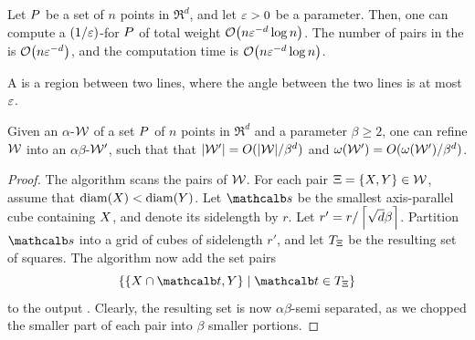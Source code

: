 \documentclass[12pt]{article}%
\begin{document}
\begin{theorem}
    Let $P$ be a set of $n$ points in $\Re^d$, and let $\varepsilon > 0$ be
    a parameter. Then, one can compute a $(1/\varepsilon)$-\SSPD for $P$ of
    total weight $\Of\pth{n \eps^{-d} \log n}$. The number of pairs in
    the \SSPD is $\Of\pth{n \eps^{-d}}$, and the computation time is
    $\Of\pth{ n \eps^{-d} \log n }$.
\end{theorem}

\begin{defn}%
    A  is a region between two lines, where
    the angle between the two lines is at most $\varepsilon$.
\end{defn}

\begin{lemma}
    Given an $\alpha$-\SSPD $\mathcal{W}$ of a set $P$ of $n$ points in
    $\Re^d$ and a parameter $\beta \geq 2$, one can refine $\mathcal{W}$ into
    an $\alpha\beta$-\SSPD $\mathcal{W}'$, such that that
    $|\mathcal{W}'| = O(|\mathcal{W}|/\beta^d)$ and
    $\WeightX{\WS'} = O(\WeightX{\WS'}/\beta^d)$.
\end{lemma}
\begin{proof}
    The algorithm scans the pairs of $\mathcal{W}$. For each pair
    $\Xi = \{ X, Y \} \in \mathcal{W}$, assume that
    $\diameterX{\PSX} < \diameterX{\PSY}$. Let $\sqr$ be the smallest
    axis-parallel cube containing $X$, and denote its sidelength by
    $r$.  Let $r' = r / \left\lceil {\sqrt{d} \beta } \right\rceil$.  Partition $\sqr$
    into a grid of cubes of sidelength $r'$, and let $T_\Xi$ be the
    resulting set of squares. The algorithm now add the set pairs
    \begin{equation*}
        \Set{ \{ \PSX \cap \sqrA, \PSY \} }{ \sqrA \in T_\Pair }
    \end{equation*}
    to the output \SSPD. Clearly, the resulting set is now
    $\alpha\beta$-semi separated, as we chopped the smaller part of
    each pair into $\beta$ smaller portions.
\end{proof}
\end{document}
